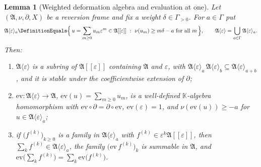\documentclass[11pt,oneside]{article}
\theoremstyle{plain}
\newtheorem{lemma}[theorem]{Lemma}
\theoremstyle{definition}
\theoremstyle{remark}
\newcommand{\K}{\mathbb{K}}
\newcommand{\compose}{\mathbin{\circ}}
\begin{document}
\begin{lemma}[Weighted deformation algebra and evaluation at one]
\label{plt:lem:lag-eval}
Let \((\mathfrak A,\nu,\partial,X)\) be a reversion frame and fix a weight
\(\delta\in\Gamma_{>0}\).  For \(a\in\Gamma\) put
\[
  \mathfrak A\langle\varepsilon\rangle_a
  \DefinitionEquals\Bigl\{\,u=\sum_{m\ge0}u_m\varepsilon^m\in\mathfrak A[[\varepsilon]]
      \ :\ \nu(u_m)\ge m\delta-a\ \text{for all }m\,\Bigr\},
  \qquad
  \mathfrak A\langle\varepsilon\rangle
  =\bigcup_{a\in\Gamma}\mathfrak A\langle\varepsilon\rangle_a .
\]
Then:
\begin{enumerate}
\item \(\mathfrak A\langle\varepsilon\rangle\) is a subring of
      \(\mathfrak A[[\varepsilon]]\) containing \(\mathfrak A\) and
      \(\varepsilon\), with
      \(\mathfrak A\langle\varepsilon\rangle_a\,\mathfrak A\langle\varepsilon
      \rangle_b\subseteq\mathfrak A\langle\varepsilon\rangle_{a+b}\), and it is
      stable under the coefficientwise extension of \(\partial\);
\item \(\mathrm{ev}\colon\mathfrak A\langle\varepsilon\rangle\to\mathfrak A\),
      \(\mathrm{ev}(u)=\sum_{m\ge0}u_m\), is a well-defined \(\K\)-algebra
      homomorphism with \(\mathrm{ev}\compose\partial=\partial\compose\mathrm{ev}\),
      \(\mathrm{ev}(\varepsilon)=1\), and
      \(\nu(\mathrm{ev}(u))\ge-a\) for \(u\in\mathfrak A\langle\varepsilon
      \rangle_a\);
\item if \(\bigl(f^{(k)}\bigr)_{k\ge0}\) is a family in
      \(\mathfrak A\langle\varepsilon\rangle_a\) with
      \(f^{(k)}\in\varepsilon^k\mathfrak A[[\varepsilon]]\), then
      \(\sum_kf^{(k)}\in\mathfrak A\langle\varepsilon\rangle_a\), the family
      \(\bigl(\mathrm{ev}\,f^{(k)}\bigr)_k\) is summable in \(\mathfrak A\), and
      \(\mathrm{ev}\bigl(\sum_kf^{(k)}\bigr)=\sum_k\mathrm{ev}\bigl(f^{(k)}\bigr)\).
\end{enumerate}
\end{lemma}
\end{document}
